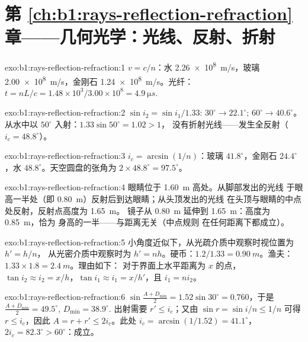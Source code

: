 \section*{第 \ref{ch:b1:rays-reflection-refraction} 章——几何光学：光线、反射、折射}

\begin{solution}{exo:b1:rays-reflection-refraction:1}
$v = c/n$：水 \qty{2.26e8}{m/s}，玻璃 \qty{2.00e8}{m/s}，金刚石
\qty{1.24e8}{m/s}。光纤：$t = nL/c = 1.48 \times 10^3/3.00\times10^8 =
\qty{4.9}{\micro s}$.
\end{solution}

\begin{solution}{exo:b1:rays-reflection-refraction:2}
$\sin i_2 = \sin i_1/1.33$: $30^\circ \to 22.1^\circ$; $60^\circ \to
40.6^\circ$。从水中以 $50^\circ$ 入射：$1.33\sin 50^\circ = 1.02 > 1$，
没有折射光线——发生全反射（$i_c = 48.8^\circ$）。
\end{solution}

\begin{solution}{exo:b1:rays-reflection-refraction:3}
$i_c = \arcsin(1/n)$：玻璃 $41.8^\circ$，金刚石 $24.4^\circ$，水
$48.8^\circ$。天空圆盘的张角为 $2 \times 48.8^\circ = 97.5^\circ$。
\end{solution}

\begin{solution}{exo:b1:rays-reflection-refraction:4}
眼睛位于 \qty{1.60}{m} 高处。从脚部发出的光线
于眼高一半处（即 \qty{0.80}{m}）反射后到达眼睛；从头顶发出的光线
在头顶与眼睛的中点处反射，反射点高度为 \qty{1.65}{m}。
镜子从 \qty{0.80}{m} 延伸到 \qty{1.65}{m}：高度为 \qty{0.85}{m}，恰为
身高的一半——与距离无关（中点规则
在任何距离下都成立）。
\end{solution}

\begin{solution}{exo:b1:rays-reflection-refraction:5}
小角度近似下，从光疏介质中观察时视位置为 $h' = h/n$，
从光密介质中观察时为 $h' = nh$。硬币：$1.2/1.33 =
\qty{0.90}{m}$。渔夫：$1.33 \times 1.8 = \qty{2.4}{m}$。理由如下：
对于界面上水平距离为 $x$ 的点，$\tan i_2 \approx i_2 =
x/h$，$\tan i_1 \approx i_1 = x/h'$，且 $i_1 = n i_2$。
\end{solution}

\begin{solution}{exo:b1:rays-reflection-refraction:6}
$\sin\frac{A + D_{\min}}{2} = 1.52\sin 30^\circ = 0.760$，于是
$\frac{A + D_{\min}}{2} = 49.5^\circ$, $D_{\min} = 38.9^\circ$.
出射需要 $r' \leq i_c$；又由 $\sin r = \sin i/n \leq 1/n$ 可得
$r \leq i_c$，因此 $A = r + r' \leq 2i_c$。此处 $i_c = \arcsin(1/1.52) =
41.1^\circ$，$2i_c = 82.3^\circ > 60^\circ$：成立。
\end{solution}

